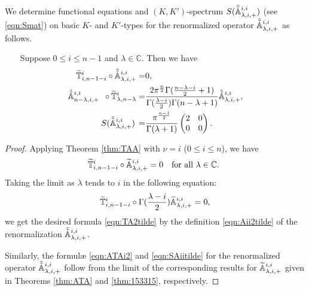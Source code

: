 We determine 
 functional equations
 and 
$(K,K')$-spectrum 
 $S(\tilde{\tilde{{\mathbb{A}}}}_{{\lambda},{i},{+}}^{{i,i}})$
 (see \eqref{eqn:Smat})
 on basic $K$- and $K'$-types
 for the renormalized operator
 $\tilde{\tilde{{\mathbb{A}}}}_{{\lambda},{i},{+}}^{{i,i}}$ as follows.  



\begin{lemma}
\label{lem:Aiiren}
~~~\newline
Suppose $0 \le i \le n-1$
 and $\lambda \in {\mathbb{C}}$.  
Then we have 
\begin{align}
\label{eqn:TA2tilde}
\widetilde{{\mathbb{T}}}_{{i},{n-1-i}}^{{i}} \circ \tilde{\tilde{{\mathbb{A}}}}_{{\lambda},{i},{+}}^{{i,i}} 
=&
0, 
\\
\label{eqn:ATAi2}
\tilde{\tilde{{\mathbb{A}}}}_{{n-\lambda},{i},{+}}^{{i,i}} 
\,\,\,
\circ \widetilde{{\mathbb{T}}}_{{\lambda},{n-\lambda}}^{{i}}
=&
\frac{2 \pi^{\frac n 2}\Gamma(\frac {n-\lambda-i}2+1)}
     {\Gamma(\frac{\lambda-i}2) \Gamma(n-\lambda+1)} \tilde{\tilde{{\mathbb{A}}}}_{{\lambda},{i},{+}}^{{i,i}}, 
\\
\label{eqn:SAiitilde}
S(\tilde{\tilde{{\mathbb{A}}}}_{{\lambda},{i},{+}}^{{i,i}}) \,=& \frac{\pi^{\frac {n-1} 2}}{\Gamma(\lambda+1)}
\begin{pmatrix} 2 & 0 \\ 0 & 0 \end{pmatrix}.  
\end{align}
\end{lemma}

\begin{proof}
Applying Theorem \ref{thm:TAA}
 with $\nu =i$ ($0 \le i \le n$), 
 we have
\[
   \widetilde{{\mathbb{T}}}_{{i},{n-1-i}}^{{i}} \circ {\widetilde{\mathbb{A}}}_{{\lambda},{i},{+}}^{{i,i}} 
   =0 
\quad \text{for all $\lambda \in {\mathbb{C}}$.  }
\]
Taking the limit as $\lambda$ tends to $i$
 in the following equation:
\[
   \widetilde{{\mathbb{T}}}_{{i},{n-1-i}}^{{i}} \circ 
   \Gamma(\frac{\lambda-i}{2})
   {\widetilde{\mathbb{A}}}_{{\lambda},{i},{+}}^{{i,i}} =0, 
\]
we get the desired formula \eqref{eqn:TA2tilde}
 by the definition \eqref{eqn:Aii2tilde} of the renormalization 
 $\tilde{\tilde{{\mathbb{A}}}}_{{\lambda},{i},{+}}^{{i,i}}$.  



Similarly,
 the formul{\ae} \eqref{eqn:ATAi2} and \eqref{eqn:SAiitilde}
 for the renormalized operator
 $\tilde{\tilde{{\mathbb{A}}}}_{{\lambda},{i},{+}}^{{i,i}}$
 follow from the limit of the corresponding results
 for ${\widetilde{\mathbb{A}}}_{{\lambda},{i},{+}}^{{i,i}}$ given in Theorems \ref{thm:ATA}
 and \ref{thm:153315}, 
 respectively.  
\end{proof}

